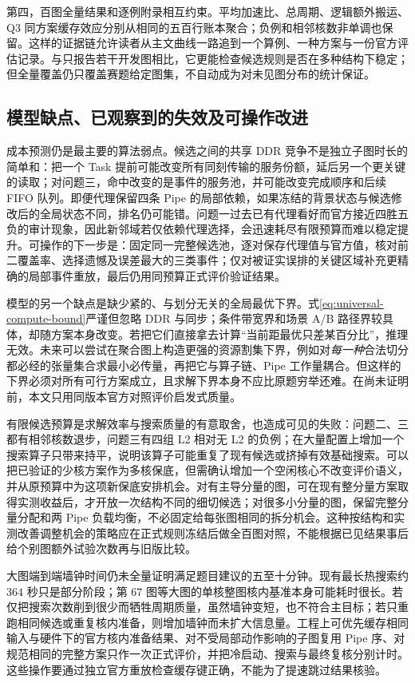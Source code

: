 第四，百图全量结果和逐例附录相互约束。平均加速比、总周期、逻辑额外搬运、Q3 同方案缓存效应分别从相同的五百行账本聚合；负例和相邻核数非单调也保留。这样的证据链允许读者从主文曲线一路追到一个算例、一种方案与一份官方评估记录。与只报告若干开发图相比，它更能检查候选规则是否在多种结构下稳定；但全量覆盖仍只覆盖赛题给定图集，不自动成为对未见图分布的统计保证。

\subsection{模型缺点、已观察到的失效及可操作改进}
成本预测仍是最主要的算法弱点。候选之间的共享 DDR 竞争不是独立子图时长的简单和：把一个 Task 提前可能改变所有同刻传输的服务份额，延后另一个更关键的读取；对问题三，命中改变的是事件的服务池，并可能改变完成顺序和后续 FIFO 队列。即便代理保留四条 Pipe 的局部依赖，如果冻结的背景状态与候选修改后的全局状态不同，排名仍可能错。问题一过去已有代理看好而官方接近四胜五负的审计现象，因此新邻域若仅依赖代理选择，会迅速耗尽有限预算而难以稳定提升。可操作的下一步是：固定同一完整候选池，逐对保存代理值与官方值，核对前二覆盖率、选择遗憾及误差最大的三类事件；仅对被证实误排的关键区域补充更精确的局部事件重放，最后仍用同预算正式评价验证结果。

模型的另一个缺点是缺少紧的、与划分无关的全局最优下界。式\eqref{eq:universal-compute-bound}严谨但忽略 DDR 与同步；条件带宽界和场景 A/B 路径界较具体，却随方案本身改变。若把它们直接拿去计算“当前距最优只差某百分比”，推理无效。未来可以尝试在聚合图上构造更强的资源割集下界，例如对\emph{每一种}合法切分都必经的张量集合求最小必传量，再把它与算子链、Pipe 工作量耦合。但这样的下界必须对所有可行方案成立，且求解下界本身不应比原题穷举还难。在尚未证明前，本文只用同版本官方对照评价启发式质量。

有限候选预算是求解效率与搜索质量的有意取舍，也造成可见的失败：问题二、三都有相邻核数退步，问题三有四组 L2 相对无 L2 的负例；在大量配置上增加一个搜索算子只带来持平，说明该算子可能重复了现有候选或挤掉有效基础搜索。可以把已验证的少核方案作为多核保底，但需确认增加一个空闲核心不改变评价语义，并从原预算中为这项新保底安排机会。对有主导分量的图，可在现有整分量方案取得实测收益后，才开放一次结构不同的细切候选；对很多小分量的图，保留完整分量分配和两 Pipe 负载均衡，不必固定给每张图相同的拆分机会。这种按结构和实测改善调整机会的策略应在正式规则冻结后做全百图对照，不能根据已见结果事后给个别图额外试验次数再与旧版比较。

大图端到端墙钟时间仍未全量证明满足题目建议的五至十分钟。现有最长热搜索约 $364$ 秒只是部分阶段；第 $67$ 图等大图的单核整图核内基准本身可能耗时很长。若仅把搜索次数削到很少而牺牲周期质量，虽然墙钟变短，也不符合主目标；若只重跑相同候选或重复核内准备，则增加墙钟而未扩大信息量。工程上可优先缓存相同输入与硬件下的官方核内准备结果、对不受局部动作影响的子图复用 Pipe 序、对规范相同的完整方案只作一次正式评价，并把冷启动、搜索与最终复核分别计时。这些操作要通过独立官方重放检查缓存键正确，不能为了提速跳过结果核验。

